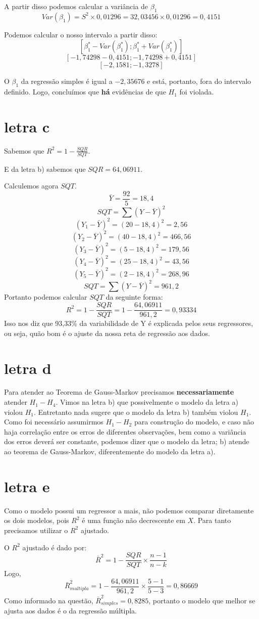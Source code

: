 A partir disso podemos calcular a variância de \(\beta_{1}\)
\[ Var(\beta_{1}) = S^{2} \times 0,01296 = 32,03456 \times 0,01296 = 0,4151\]

Podemos calcular o nosso intervalo a partir disso:
\[ [\beta^{*}_{1}-Var(\beta^{*}_{1});\beta^{*}_{1}+Var(\beta^{*}_{1})]\]
\[[-1,74298-0,4151;-1,74298+0,4151]\]
\[[-2,1581;-1,3278]\]

O \(\beta_{1}\) da regressão simples é igual a \(-2,35676\) e está, portanto, fora do intervalo definido. Logo, concluímos que \textbf{há} evidências de que \(H_{1}\) foi violada.

\section*{letra c}
Sabemos que \(R^{2} = 1 - \frac{SQR}{SQT}\).

E da letra b) sabemos que \(SQR = 64,06911\).

Calculemos agora \(SQT\).
\[\bar{Y} = \frac{92}{5} = 18,4\]
\[SQT = \sum (Y - \bar{Y})^{2}\]
\[(Y_{1} - \bar{Y})^2 = (20 - 18,4)^2 = 2,56\]
\[(Y_{2} - \bar{Y})^2 = (40 - 18,4)^2 = 466,56\]
\[(Y_{3} - \bar{Y})^2 = (5 - 18,4)^2 = 179,56\]
\[(Y_{4} - \bar{Y})^2 = (25 - 18,4)^2 = 43,56\]
\[(Y_{5} - \bar{Y})^2 = (2 - 18,4)^2 = 268,96\]
\[SQT = \sum (Y - \bar{Y})^{2} = 961,2\]
Portanto podemos calcular \(SQT\) da seguinte forma:
\[R^{2} = 1 - \frac{SQR}{SQT} = 1 - \frac{64,06911}{961,2} = 0,93334\]
Isso nos diz que 93,33\% da variabilidade de Y é explicada pelos seus regressores, ou seja, quão bom é o ajuste da nossa reta de regressão aos dados.

\section*{letra d}
Para atender ao Teorema de Gauss-Markov precisamos \textbf{necessariamente} atender \(H_{1}-H_{4}\). Vimos na letra b) que possivelmente  o modelo da letra a) violou \(H_{1}\). Entretanto nada sugere que o modelo da letra b) também violou \(H_{1}\). Como foi necessário assumirmos \(H_{1}-H_{2}\) para construção do modelo, e caso não haja correlação entre os erros de diferentes observações, bem como a variância dos erros deverá ser constante, podemos dizer que o modelo da letra; b) atende ao teorema de Gauss-Markov, diferentemente do modelo da letra a).

\section*{letra e}
Como o modelo possui um regressor a mais, não podemos comparar diretamente os dois modelos, pois \(R^{2}\) é uma função não decrescente em \(X\). Para tanto precisamos utilizar o \(R^{2}\) ajustado.

O \(R^{2}\) ajustado é dado por:
\[ \bar{R}^{2} = 1 - \frac{SQR}{SQT} \times \frac{n - 1}{n - k}\]
Logo,
\[\bar{R}^{2}_{multipla} = 1 - \frac{64,06911}{961,2} \times \frac{5 - 1}{5 - 3} = 0,86669\]
Como informado na questão, \(\bar{R}^{2}_{simples} = 0,8285\), portanto o modelo que melhor se ajusta aos dados é o da regressão múltipla.
